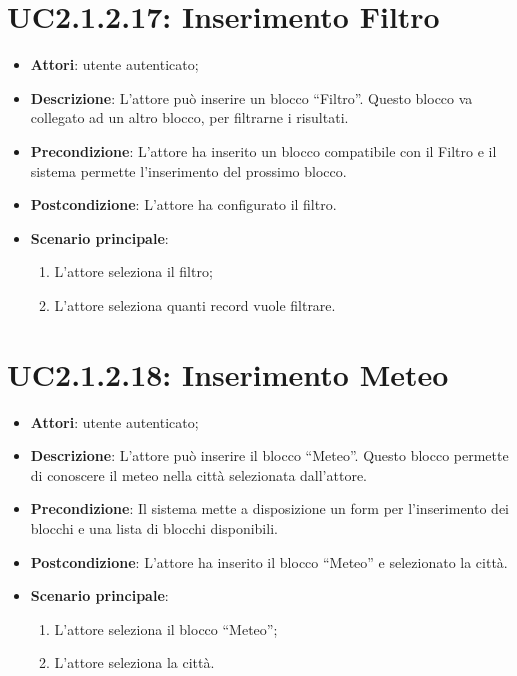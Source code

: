 \section{UC2.1.2.17: Inserimento Filtro}
\label{UC2.1.2.17}
\begin{itemize}
	\item \textbf{Attori}: utente autenticato;
	\item \textbf{Descrizione}: L'attore può inserire un blocco ``Filtro''. Questo blocco va collegato ad un altro blocco, per filtrarne i risultati. 
	\item \textbf{Precondizione}: L'attore ha inserito un blocco compatibile con il Filtro e il sistema permette l'inserimento del prossimo blocco.
	\item \textbf{Postcondizione}: L'attore ha configurato il filtro. 
	\item \textbf{Scenario principale}:
	\begin{enumerate} \item L'attore seleziona il filtro;  \item  L'attore seleziona quanti record vuole filtrare.\end{enumerate}
\end{itemize}

\section{UC2.1.2.18: Inserimento Meteo}
\label{UC2.1.2.18}
\begin{itemize}
	\item \textbf{Attori}: utente autenticato;
	\item \textbf{Descrizione}: L'attore può inserire il blocco ``Meteo''. Questo blocco permette di conoscere il meteo nella città selezionata dall'attore.
	\item \textbf{Precondizione}: Il sistema mette a disposizione un form per l'inserimento dei blocchi e una lista di blocchi disponibili.	
	\item \textbf{Postcondizione}: L'attore ha inserito il blocco ``Meteo'' e selezionato la città.
	\item \textbf{Scenario principale}:
	\begin{enumerate} \item L'attore seleziona il blocco ``Meteo'';  \item  L'attore seleziona la città.\end{enumerate}
\end{itemize}

